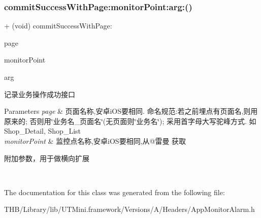 \subsubsection{\texorpdfstring{commit\+Success\+With\+Page\+:monitor\+Point\+:arg\+:()}{commitSuccessWithPage:monitorPoint:arg:()}}
{\footnotesize\ttfamily + (void) commit\+Success\+With\+Page\+: \begin{DoxyParamCaption}\item[{(N\+S\+String $\ast$)}]{page }\item[{monitorPoint:(N\+S\+String $\ast$)}]{monitor\+Point }\item[{arg:(N\+S\+String $\ast$)}]{arg }\end{DoxyParamCaption}}

记录业务操作成功接口


\begin{DoxyParams}{Parameters}
{\em page} & 页面名称,安卓i\+O\+S要相同. 命名规范\+:若之前埋点有页面名,则用原来的; 否则用\char`\"{}业务名\+\_\+页面名\char`\"{}(无页面则\char`\"{}业务名\char`\"{}); 采用首字母大写驼峰方式. 如\+Shop\+\_\+\+Detail, Shop\+\_\+\+List \\
\hline
{\em monitor\+Point} & 监控点名称,安卓i\+O\+S要相同,从@雷曼 获取 \begin{DoxyItemize}
\item 附加参数，用于做横向扩展 \end{DoxyItemize}
\\
\hline
\end{DoxyParams}


The documentation for this class was generated from the following file\+:\begin{DoxyCompactItemize}
\item 
T\+H\+B/\+Library/lib/\+U\+T\+Mini.\+framework/\+Versions/\+A/\+Headers/App\+Monitor\+Alarm.\+h\end{DoxyCompactItemize}

